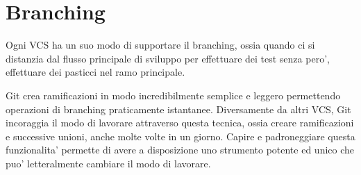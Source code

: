 \section{Branching}
Ogni VCS ha un suo modo di supportare il branching, ossia quando ci si distanzia dal flusso principale di sviluppo per effettuare dei test senza pero', effettuare dei pasticci nel ramo principale.

Git crea ramificazioni in modo incredibilmente semplice e leggero permettendo operazioni di branching praticamente istantanee. Diversamente da altri VCS, Git incoraggia il modo di lavorare attraverso questa tecnica, ossia creare ramificazioni e successive unioni, anche molte volte in un giorno. Capire e padroneggiare questa funzionalita' permette di avere a disposizione uno strumento potente ed unico che puo' letteralmente cambiare il modo di lavorare.
